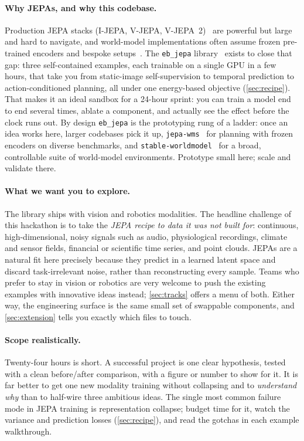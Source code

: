 \documentclass{article}
\begin{document}
\paragraph{Why JEPAs, and why this codebase.}
Production JEPA stacks (I-JEPA, V-JEPA, V-JEPA~2)~\citep{IJEPA,VJEPA,VJEPA2} are
powerful but large and hard to navigate, and world-model implementations often
assume frozen pre-trained encoders and bespoke setups~\citep{DINO-WM,terver2026JEPAWMs}.
The \texttt{eb\_jepa} library~\citep{EBJEPA}
exists to close that gap: three self-contained examples, each trainable on a
single GPU in a few hours, that take you from static-image self-supervision to
temporal prediction to action-conditioned planning, all under one energy-based
objective (\cref{sec:recipe}). That makes it an ideal sandbox for a 24-hour
sprint: you can train a model end to end several times, ablate a component, and
actually see the effect before the clock runs out. By design \texttt{eb\_jepa} is
the prototyping rung of a ladder: once an idea works here, larger codebases pick
it up, \texttt{jepa-wms}~\citep{terver2026JEPAWMs} for planning with frozen
encoders on diverse benchmarks, and \texttt{stable-worldmodel}~\citep{stableworldmodel}
for a broad, controllable suite of world-model environments. Prototype small here;
scale and validate there.

\paragraph{What we want you to explore.}
The library ships with vision and robotics modalities. The headline challenge of
this hackathon is to take the \emph{JEPA recipe to data it was not built for}:
continuous, high-dimensional, noisy signals such as audio, physiological
recordings, climate and sensor fields, financial or scientific time series, and
point clouds. JEPAs are a natural fit here precisely because they predict in a
learned latent space and discard task-irrelevant noise, rather than reconstructing
every sample. Teams who prefer to stay in vision or robotics are very welcome to
push the existing examples with innovative ideas instead; \cref{sec:tracks}
offers a menu of both. Either way, the engineering surface is the same small set
of swappable components, and \cref{sec:extension} tells you exactly which files
to touch.

\paragraph{Scope realistically.}
Twenty-four hours is short. A successful project is one clear hypothesis,
tested with a clean before/after comparison, with a figure or number to show for
it. It is far better to get one new modality training without collapsing and to
\emph{understand why} than to half-wire three ambitious ideas. The single most
common failure mode in JEPA training is representation collapse; budget time for
it, watch the variance and prediction losses (\cref{sec:recipe}), and read the
gotchas in each example walkthrough.
\end{document}
